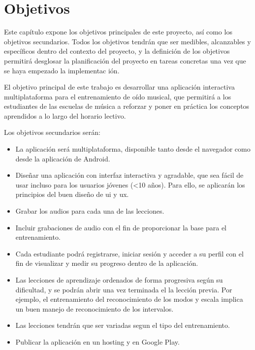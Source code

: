 
\chapter{Objetivos}
\label{objetivos}
Este capítulo expone los objetivos principales de este proyecto, así como los objetivos secundarios. Todos los objetivos tendrán que ser medibles, alcanzables y específicos dentro del contexto del proyecto, y la definición de los objetivos permitirá desglosar la planificación del proyecto en tareas concretas una vez que se haya empezado la implementac	ión.
\par El objetivo principal de este trabajo es desarrollar una aplicación interactiva multiplataforma para el entrenamiento de oído musical, que permitirá a los estudiantes de las escuelas de música a reforzar y poner en práctica los conceptos aprendidos a lo largo del horario lectivo.
\par Los objetivos secundarios serán:
\begin{itemize}
	\item La aplicación será multiplataforma, disponible tanto desde el navegador como desde la aplicación de Android.
	\item Diseñar una aplicación con interfaz interactiva y agradable, que sea fácil de usar incluso para los usuarios jóvenes (<10 años). Para ello, se aplicarán los principios del buen diseño de \gls{ui} y \gls{ux}.
	\item Grabar los audios para cada una de las lecciones.
	\item Incluir grabaciones de audio con el fin de proporcionar la base para el entrenamiento.
	\item Cada estudiante podrá registrarse, iniciar sesión y acceder a su perfil con el fin de visualizar y medir su progreso dentro de la aplicación.
	\item Las lecciones de aprendizaje ordenados de forma progresiva según su dificultad, y se podrán abrir una vez terminada el la lección previa. Por ejemplo, el entrenamiento del reconocimiento de los modos y escala implica un buen manejo de reconocimiento de los intervalos.
	\item Las lecciones tendrán que ser variadas segun el tipo del entrenamiento.
	\item Publicar la aplicación en un hosting y en Google Play.
\end{itemize}
